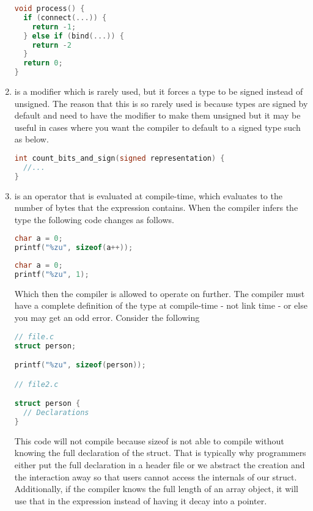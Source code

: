 \begin{enumerate}
	      \begin{lstlisting}[language=C]
void process() {
  if (connect(...)) {
    return -1;
  } else if (bind(...)) {
    return -2
  }
  return 0;
}
\end{lstlisting}

	    \item {} is a modifier which is rarely used, but it forces a type to be signed instead of unsigned.
        The reason that this is so rarely used is because types are signed by default and need to have the  modifier to make them unsigned but it may be useful in cases where you want the compiler to default to a signed type such as below.

	      \begin{lstlisting}[language=C]
int count_bits_and_sign(signed representation) {
  //...
}
\end{lstlisting}
	    \item {} is an operator that is evaluated at compile-time, which evaluates to the number of bytes that the expression contains.
        When the compiler infers the type the following code changes as follows.
	      \begin{lstlisting}[language=C]
char a = 0;
printf("%zu", sizeof(a++));
\end{lstlisting}

	      \begin{lstlisting}[language=C]
char a = 0;
printf("%zu", 1);
\end{lstlisting}

	      Which then the compiler is allowed to operate on further.
        The compiler must have a complete definition of the type at compile-time - not link time - or else you may get an odd error.
        Consider the following

	      \begin{lstlisting}[language=C]
// file.c
struct person;

printf("%zu", sizeof(person));

// file2.c

struct person {
  // Declarations
}
\end{lstlisting}

	      This code will not compile because sizeof is not able to compile  without knowing the full declaration of the  struct.
        That is typically why programmers either put the full declaration in a header file or we abstract the creation and the interaction away so that users cannot access the internals of our struct.
        Additionally, if the compiler knows the full length of an array object, it will use that in the expression instead of having it decay into a pointer.


\end{enumerate}
